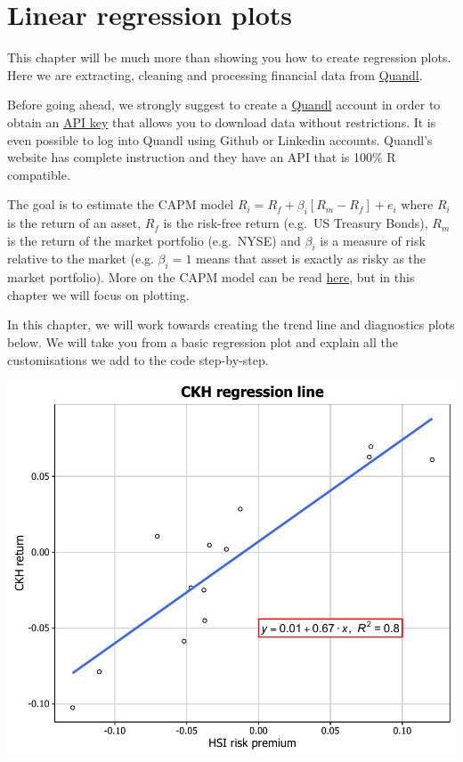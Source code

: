 \chapter{Linear regression plots}

This chapter will be much more than showing you how to create regression
plots. Here we are extracting, cleaning and processing financial data
from \href{https://www.quandl.com/}{Quandl}.

Before going ahead, we strongly suggest to create a
\href{https://www.quandl.com/}{Quandl} account in order to obtain an
\href{https://www.quandl.com/account/api}{API key} that allows you to
download data without restrictions. It is even possible to log into
Quandl using Github or Linkedin accounts. Quandl's website has complete
instruction and they have an API that is 100\% R compatible.

The goal is to estimate the CAPM model
\(R_i = R_f + \beta_i [R_m - R_f] + e_i\) where \(R_i\) is the return of
an asset, \(R_f\) is the risk-free return (e.g.~US Treasury Bonds),
\(R_m\) is the return of the market portfolio (e.g.~NYSE) and
\(\beta_i\) is a measure of risk relative to the market (e.g.
\(\beta_i = 1\) means that asset is exactly as risky as the market
portfolio). More on the CAPM model can be read
\href{http://people.stern.nyu.edu/ashapiro/courses/B01.231103/FFL09.pdf}{here},
but in this chapter we will focus on plotting.

In this chapter, we will work towards creating the trend line and
diagnostics plots below. We will take you from a basic regression plot
and explain all the customisations we add to the code step-by-step.

\begin{center}\includegraphics[width=0.6\linewidth]{11_Linear_Regression_Plot_pdf/lr_final-1} \end{center}

